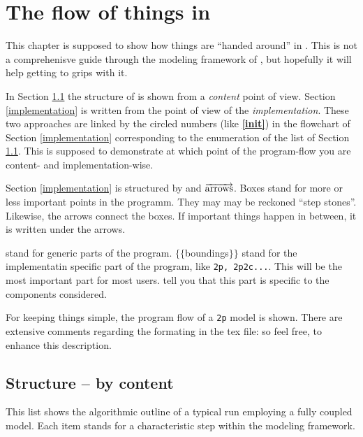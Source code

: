 
\newcommand{\nextline}{\par\phantom{a}\vspace*{0.1\textwidth}}
\chapter{The flow of things in \Dumux}
\label{flow}

This chapter is supposed to show how things are ``handed around'' in \Dumux. This is not a comprehenisve guide through the modeling framework of \Dumux, but hopefully it will help getting to grips with it. 

In Section \ref{content} the structure of \Dumux is shown from a \emph{content} point of view.
Section \ref{implementation} is written from the point of view of the \emph{implementation}. These two approaches are linked by the circled numbers (like \textbf{\textcircled{\ref{init}}}) in the flowchart of Section \ref{implementation} corresponding to the enumeration of the list of Section \ref{content}. This is supposed to demonstrate at which point of the program-flow you are content- and implementation-wise. 

Section \ref{implementation} is structured by  and $\overrightarrow{\textnormal{arrows}}$. Boxes stand for more or less important points in the programm. They may may be reckoned ``step stones''. Likewise, the arrows connect the boxes. If important things happen in between, it is written under the arrows.

 stand for generic parts of the program.  $\lbrace\lbrace$boundings$\rbrace\rbrace$ stand for the implementatin specific part of the program, like \verb+2p, 2p2c...+. This will be the most important part for most users.  tell you that this part is specific to the components considered. 

For keeping things simple, the program flow of a \verb+2p+ model is shown.
There are extensive comments regarding the formating in the tex file: so feel free, to enhance this description.

\section{Structure -- by content}
\label{content}
This list shows the algorithmic outline of a typical \Dumux run employing a fully coupled model. Each item stands for a characteristic step within the modeling framework. 

